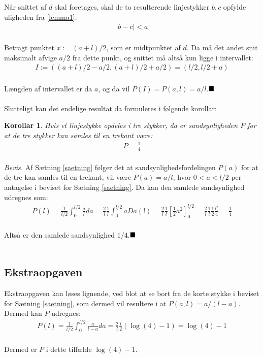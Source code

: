 \documentclass[a4paper,12pt]{article}
\newtheorem{corollary}[section]{Korollar}
\renewcommand{\qed}{\hfill\blacksquare}
\newcommand{\eq}[1]{\begin{align*} #1\\ \end{align*}}
\begin{document}
Når snittet af $d$ skal foretages, skal de to resulterende linjestykker $b,c$ opfylde uligheden fra \ref{lemma1}:
\eq{
|b-c|<a
}

Betragt punktet $x:=(a+l)/2$, som er midtpunktet af $d$. Da må det andet snit maksimalt afvige $a/2$ fra dette punkt, og snittet må altså kun ligge i intervallet:
\eq{
I:=((a+l)/2-a/2,(a+l)/2+a/2)=(l/2,l/2+a)
}

Længden af intervallet er da $a$, og da vil $P(I)=P(a,l)=a/l$.$\qed$\\\\

Slutteligt kan det endelige resultat da formuleres i følgende korollar:
\begin{corollary}
Hvis et linjestykke opdeles i tre stykker, da er sandsynligheden $P$ for at de tre stykker kan samles til en trekant være:
\eq{
P=\frac{1}{4}
}
\end{corollary}
\textit{Bevis.}
Af Sætning \ref{saetning} følger det at sandsynlighedsfordelingen $P(a)$ for at de tre kan samles til en trekant, vil være $P(a)=a/l$, hvor $0<a<l/2$ per antagelse i beviset for Sætning \ref{saetning}. Da kan den samlede sandsynlighed udregnes som:
\eq{
P(l)=\frac{1}{l/2}\int_0^{l/2} \frac{a}{l}da=\frac{2}{l}\frac{1}{l}\int_0^{l/2}aDa(!)=\frac{2}{l}\frac{1}{l}\left[\frac{1}{2}a^2\right]_0^{l/2}=\frac{2}{l}\frac{1}{l}\frac{1}{2}\frac{l^2}{4}=\frac{1}{4}
}

Altså er den samlede sandsynlighed $1/4$.$\qed$\\\\

\subsection*{Ekstraopgaven}
Ekstraopgaven kan løses lignende, ved blot at se bort fra de korte stykke i beviset for Sætning \ref{saetning}, som dermed vil resultere i at $P(a,l)=a/(l-a)$. Dermed kan $P$ udregnes:
\eq{
P(l)=\frac{1}{l/2}\int_0^{l/2} \frac{a}{l-a}da=\frac{2}{l}\frac{l}{2}(\log(4)-1)=\log(4)-1
}

Dermed er $P$ i dette tilfælde $\log (4)-1$.
\end{document}
